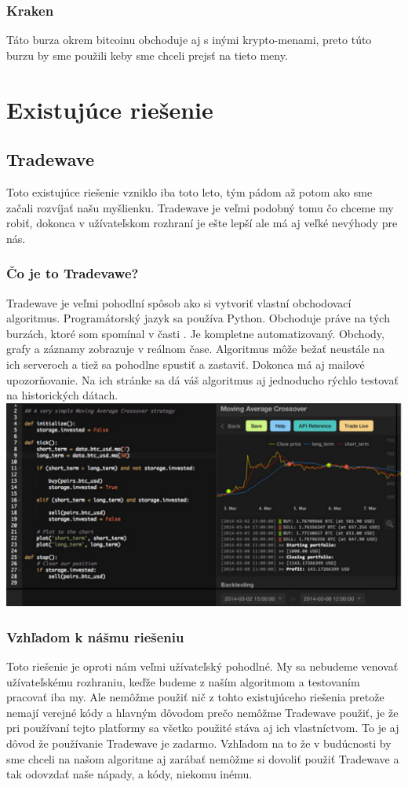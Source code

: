 \subsubsection{Kraken} 
Táto burza okrem bitcoinu obchoduje aj  s inými krypto-menami, preto túto burzu by sme použili keby sme chceli prejsť na tieto meny. \cite{Kre} 
\section{Existujúce riešenie} 
\subsection{Tradewave} 
Toto existujúce riešenie vzniklo iba toto leto, tým pádom až potom ako sme začali rozvíjať našu myšlienku. Tradewave je veľmi podobný tomu čo chceme my robiť, dokonca v užívateľskom rozhraní je ešte lepší ale má aj veľké nevýhody pre nás.  
\subsubsection{Čo je to Tradevawe?} 
Tradewave je veľmi pohodlní spôsob ako si vytvoriť vlastní obchodovací algoritmus. Programátorský jazyk sa používa Python. Obchoduje práve na tých burzách, ktoré som spomínal v časti . Je kompletne automatizovaný. Obchody, grafy a záznamy zobrazuje v reálnom čase. Algoritmus môže bežať neustále na ich serveroch a tiež sa pohodlne spustiť a zastaviť. Dokonca má aj mailové upozorňovanie. Na ich stránke sa dá váš algoritmus aj jednoducho rýchlo testovať na historických dátach.  \cite{Tw} 
\includegraphics[width=1\textwidth]{trade} 
\subsubsection{Vzhľadom k nášmu riešeniu} 
Toto riešenie je oproti nám veľmi užívateľský pohodlné. My sa nebudeme venovať užívateľskému rozhraniu, keďže budeme z naším algoritmom a testovaním  pracovať iba my. Ale nemôžme použiť nič z tohto existujúceho riešenia pretože nemají verejné kódy a hlavným dôvodom prečo nemôžme Tradewave použiť, je že pri používaní tejto platformy sa všetko použité stáva aj ich vlastníctvom. To je aj dôvod že používanie Tradewave je zadarmo. Vzhľadom na to že v budúcnosti by sme chceli na našom algoritme aj zarábať nemôžme si dovoliť použiť Tradewave a tak odovzdať naše nápady, a kódy, niekomu inému. 
